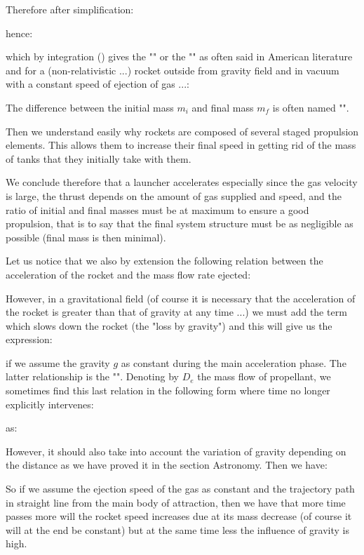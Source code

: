 	Therefore after simplification:
	
	hence:
	
	which by integration () gives the "" or the "" as often said in American literature and for a (non-relativistic ...) rocket outside from gravity field and in vacuum with a constant speed  of ejection of gas ...:
	
	The difference between the initial mass $m_i$ and final mass $m_f$ is often named "".
	
	Then we understand easily why rockets are composed of several staged propulsion elements. This allows them to increase their final speed in getting rid of the mass of tanks that they initially take with them.

	We conclude therefore that a launcher accelerates especially since the gas velocity is large, the thrust depends on the amount of gas supplied and speed, and the ratio of initial and final masses must be at maximum to ensure a good propulsion, that is to say that the final system structure must be as negligible as possible (final mass is then minimal).
	
	Let us notice that we also by extension the following relation between the acceleration of the rocket and the mass flow rate ejected:
	
	However, in a gravitational field (of course it is necessary that the acceleration of the rocket is greater than that of gravity at any time ...) we must add the term which slows down the rocket (the "loss by gravity") and this will give us the expression:
	
	if we assume the gravity $g$ as constant during the main acceleration phase. The latter relationship is the "". Denoting by $D_e$ the mass flow of propellant, we sometimes find this last relation in the following form where time no longer explicitly intervenes:
	
	as:
	
	However, it should also take into account the variation of gravity depending on the distance as we have proved it in the section Astronomy. Then we have:
	
	So if we assume the ejection speed of the gas as constant and the trajectory path in straight line from the main body of attraction, then we have that more time passes more will the rocket speed increases due at its mass decrease (of course it will at the end be constant) but at the same time less the influence of gravity is high.
	
